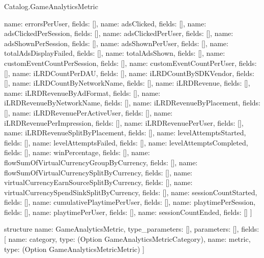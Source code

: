 \begin{lexlean}{Catalog.GameAnalyticsMetric}
\begin{semanticmodule}
{    {name: errorsPerUser, fields: []},
    {name: adsClicked, fields: []},
    {name: adsClickedPerSession, fields: []},
    {name: adsClickedPerUser, fields: []},
    {name: adsShownPerSession, fields: []},
    {name: adsShownPerUser, fields: []},
    {name: totalAdsDisplayFailed, fields: []},
    {name: totalAdsShown, fields: []},
    {name: customEventCountPerSession, fields: []},
    {name: customEventCountPerUser, fields: []},
    {name: iLRDCountPerDAU, fields: []},
    {name: iLRDCountBySDKVendor, fields: []},
    {name: iLRDCountByNetworkName, fields: []},
    {name: iLRDRevenue, fields: []},
    {name: iLRDRevenueByAdFormat, fields: []},
    {name: iLRDRevenueByNetworkName, fields: []},
    {name: iLRDRevenueByPlacement, fields: []},
    {name: iLRDRevenuePerActiveUser, fields: []},
    {name: iLRDRevenuePerImpression, fields: []},
    {name: iLRDRevenuePerUser, fields: []},
    {name: iLRDRevenueSplitByPlacement, fields: []},
    {name: levelAttemptsStarted, fields: []},
    {name: levelAttemptsFailed, fields: []},
    {name: levelAttemptsCompleted, fields: []},
    {name: winPercentage, fields: []},
    {name: flowSumOfVirtualCurrencyGroupByCurrency, fields: []},
    {name: flowSumOfVirtualCurrencySplitByCurrency, fields: []},
    {name: virtualCurrencyEarnSourceSplitByCurrency, fields: []},
    {name: virtualCurrencySpendSinkSplitByCurrency, fields: []},
    {name: sessionCountStarted, fields: []},
    {name: cumulativePlaytimePerUser, fields: []},
    {name: playtimePerSession, fields: []},
    {name: playtimePerUser, fields: []},
    {name: sessionCountEnded, fields: []}
  ]
}

structure{
  name: GameAnalyticsMetric,
  type_parameters: [],
  parameters: [],
  fields: [
    {name: category, type: (Option GameAnalyticsMetricCategory)},
    {name: metric, type: (Option GameAnalyticsMetricMetric)}
  ]
}
\end{semanticmodule}
\end{lexlean}
